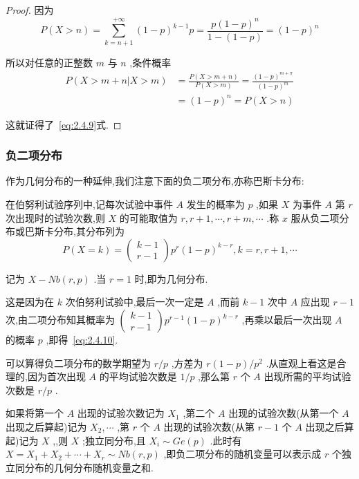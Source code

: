 \begin{proof}
	因为
	\[
	P(X>n)=\sum_{k=n+1}^{+\infty}(1-p)^{k-1} p=\frac{p(1-p)^{n}}{1-(1-p)}=(1-p)^{n}
	\]
	
	所以对任意的正整数 $ m $ 与 $ n $ ,条件概率
	\[
	\begin{aligned} P(X>m+n | X>m) &=\frac{P(X>m+n)}{P(X>m)}=\frac{(1-p)^{m+\pi}}{(1-p)^{m}} \\ &=(1-p)^{n}=P(X>n) \end{aligned}
	\]
	
	这就证得了~\ref{eq:2.4.9}式.
\end{proof}

\subsubsection{负二项分布}

作为几何分布的一种延伸,我们注意下面的负二项分布,亦称巴斯卡分布:

在伯努利试验序列中,记每次试验中事件 $ A $ 发生的概率为 $ p $ ,如果 $ X $ 为事件 $ A $ 第 $ r $ 次出现时的试验次数,则 $ X $ 的可能取值为 $ r, r+1, \cdots, r+m, \cdots $ .称 $ x $ 服从负二项分布或巴斯卡分布,其分布列为
\begin{equation}
P(X=k)=\left( \begin{array}{l}{k-1} \\ {r-1}\end{array}\right) p^{r}(1-p)^{k-r}, k=r, r+1, \cdots \label{eq:2.4.10}
\end{equation}

记为 $ X-N b(r, p) $ .当 $ r=1 $ 时,即为几何分布.

这是因为在 $ k $ 次伯努利试验中,最后一次一定是 $ A $ ,而前 $ k-1 $ 次中 $ A $ 应出现 $ r-1 $ 次,由二项分布知其概率为 $ \left( \begin{array}{l}{k-1} \\ {r-1}\end{array}\right) p^{r-1}(1-p)^{k-r} $ ,再乘以最后一次出现 $ A $ 的概率 $ p $ ,即得~\ref{eq:2.4.10}.

可以算得负二项分布的数学期望为 $ r / p $ ,方差为 $ r(1-p)/p^{2} $ .从直观上看这是合理的,因为首次出现 $ A $ 的平均试验次数是 $ 1/p $ ,那么第 $ r $ 个 $ A $ 出现所需的平均试验次数是 $ r / p $ .

如果将第一个 $ A $ 出现的试验次数记为 $ X_{1} $ ,第二个 $ A $ 出现的试验次数(从第一个 $ A $ 出现之后算起)记为 $ X_{2}, \cdots $ ,第 $ r $ 个 $ A $ 出现的试验次数(从第 $ r-1 $ 个 $ A $ 出现之后算起)记为 $ X $ ,,则 $ X $ ;独立同分布,且 $ X_{i} \sim G e(p) $ .此时有 $ X=X_{1}+ X_{2}+\cdots+X_{r} \sim N b(r, p) $ ,即负二项分布的随机变量可以表示成 $ r $ 个独立同分布的几何分布随机变量之和.

